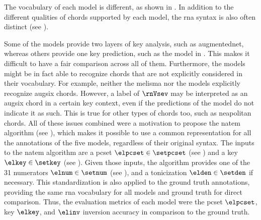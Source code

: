 
The vocabulary of each model is different, as shown in
. In addition to the different
qualities of chords supported by each model, the \gls{rna}
syntax is also often distinct (see
). 


Some of the models provide two layers of key analysis, such
as \gls{augmentednet}, whereas others provide one key
prediction, such as the model in
\textcite{mcleod2021modular}. This makes it difficult to
have a fair comparison across all of them. Furthermore, the
models might be in fact able to recognize chords that are
not explicitly considered in their vocabulary. For example,
neither the \gls{melisma} nor the
\textcite{mcleod2021modular} models explicitly recognize
\gls{augsix} chords. However, a label of $\rnVsev$ may be
interpreted as an \gls{augsix} chord in a certain key
context, even if the predictions of the model do not
indicate it as such. This is true for other types of chords
too, such as \gls{neapolitan} chords. All of these issues
combined were a motivation to propose the \gls{natem}
algorithm (see
), which
makes it possible to use a common representation for all the
annotations of the five models, regardless of their original
syntax. The inputs to the \gls{natem} algorithm are a
\gls{pcset} $\elpcset \in \setpcset$ (see
) and a key $\elkey
\in \setkey$ (see ).
Given those inputs, the algorithm provides one of the 31
numerators $\elnum \in \setnum$ (see
), and a
tonicization $\elden \in \setden$ if necessary. This
standardization is also applied to the ground truth
annotations, providing the same \gls{rna} vocabulary for all
models and ground truth for direct comparison. Thus, the
evaluation metrics of each model were the \gls{pcset}
$\elpcset$, key $\elkey$, and $\elinv$ inversion accuracy in
comparison to the ground truth.

